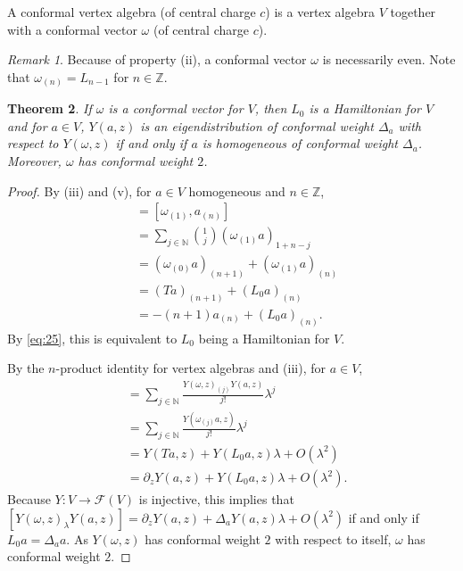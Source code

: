 \documentclass[a4paper, 12pt, reqno]{amsart}
\newtheorem{theorem}{Theorem}[subsection]
\theoremstyle{remark}
\newtheorem{remark}[theorem]{Remark}
\numberwithin{equation}{subsection}
\begin{document}
A conformal vertex algebra (of central charge $c$) is a vertex algebra $V$ together with a conformal vector $\omega$ (of central charge $c$).

\begin{remark}
  \label{rmk:15}
  Because of property (ii), a conformal vector $\omega$ is necessarily even.
  Note that $\omega_{(n)} = L_{n - 1}$ for $n \in \mathbb{Z}$.
\end{remark}

\begin{theorem}
  \label{thr:18}
  If $\omega$ is a conformal vector for $V$, then $L_0$ is a Hamiltonian for $V$ and for $a \in V$, $Y(a, z)$ is an eigendistribution of conformal weight $\Delta_a$ with respect to $Y(\omega, z)$ if and only if $a$ is homogeneous of conformal weight $\Delta_a$.
  Moreover, $\omega$ has conformal weight $2$.
\end{theorem}

\begin{proof}
  By (iii) and (v), for $a \in V$ homogeneous and $n \in \mathbb{Z}$,
  \begin{align*}
    [L_0, a_{(n)}] &= [\omega_{(1)}, a_{(n)}] \\
    &= \sum_{j \in \mathbb{N}}\binom{1}{j}(\omega_{(1)}a)_{1 + n - j} \\
    &= (\omega_{(0)}a)_{( n + 1)} + (\omega_{(1)}a)_{(n)} \\
    &= (Ta)_{(n + 1)} + (L_0a)_{(n)} \\
    &= -(n + 1)a_{(n)} + (L_0a)_{(n)}.
  \end{align*}
  By \eqref{eq:25}, this is equivalent to $L_0$ being a Hamiltonian for $V$.

  By the $n$-product identity for vertex algebras and (iii), for $a \in V$,
  \begin{align*}
    [Y(\omega, z)_{\lambda}Y(a, z)] &= \sum_{j \in \mathbb{N}}\frac{Y(\omega, z)_{(j)}Y(a, z)}{j!}\lambda^j \\
    &= \sum_{j \in \mathbb{N}}\frac{Y(\omega_{(j)}a, z)}{j!}\lambda^j \\
    &= Y(Ta, z) + Y(L_0a, z)\lambda + O(\lambda^2) \\
    &= \partial_zY(a, z) + Y(L_0a, z)\lambda + O(\lambda^2).
  \end{align*}
  Because $Y: V \to \mathcal{F}(V)$ is injective, this implies that $[Y(\omega, z)_{\lambda}Y(a, z)] = \partial_zY(a, z) + \Delta_aY(a, z)\lambda + O(\lambda^2)$ if and only if $L_0a = \Delta_aa$.
  As $Y(\omega, z)$ has conformal weight $2$ with respect to itself, $\omega$ has conformal weight $2$.
\end{proof}
\end{document}
